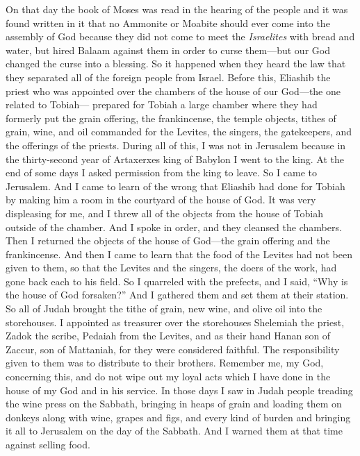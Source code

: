 \begin{biblechapter} %
 On that day the book of Moses was read in the hearing of the people and it was found written in it that no Ammonite or Moabite should ever come into the assembly of God
\verse because they did not come to meet the \textit{Israelites} with bread and water, but hired Balaam against them in order to curse them—but our God changed the curse into a blessing.
\verse So it happened when they heard the law that they separated all of the foreign people from Israel.
 Before this, Eliashib the priest who was appointed over the chambers of the house of our God—the one related to Tobiah—
\verse prepared for Tobiah a large chamber where they had formerly put the grain offering, the frankincense, the temple objects, tithes of grain, wine, and oil commanded for the Levites, the singers, the gatekeepers, and the offerings of the priests.
\verse During all of this, I was not in Jerusalem because in the thirty-second year of Artaxerxes king of Babylon I went to the king. At the end of some days I asked permission from the king to leave.
\verse So I came to Jerusalem. And I came to learn of the wrong that Eliashib had done for Tobiah by making him a room in the courtyard of the house of God.
\verse It was very displeasing for me, and I threw all of the objects from the house of Tobiah outside of the chamber.
\verse And I spoke in order, and they cleansed the chambers. Then I returned the objects of the house of God—the grain offering and the frankincense.
\verse And then I came to learn that the food of the Levites had not been given to them, so that the Levites and the singers, the doers of the work, had gone back each to his field.
\verse So I quarreled with the prefects, and I said, “Why is the house of God forsaken?” And I gathered them and set them at their station.
\verse So all of Judah brought the tithe of grain, new wine, and olive oil into the storehouses.
\verse I appointed as treasurer over the storehouses Shelemiah the priest, Zadok the scribe, Pedaiah from the Levites, and as their hand Hanan son of Zaccur, son of Mattaniah, for they were considered faithful. The responsibility given to them was to distribute to their brothers.
\verse Remember me, my God, concerning this, and do not wipe out my loyal acts which I have done in the house of my God and in his service.
 In those days I saw in Judah people treading the wine press on the Sabbath, bringing in heaps of grain and loading them on donkeys along with wine, grapes and figs, and every kind of burden and bringing it all to Jerusalem on the day of the Sabbath. And I warned them at that time against selling food.

\end{biblechapter}
